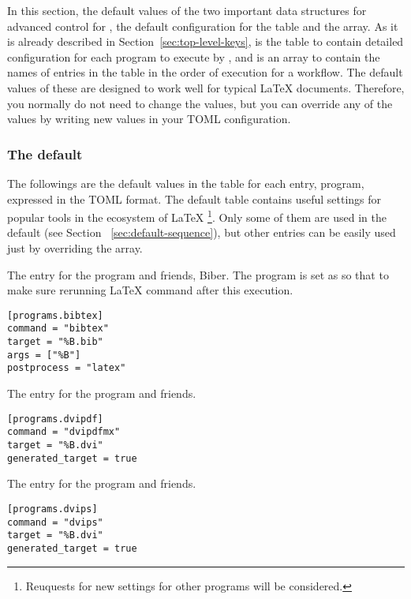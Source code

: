 \documentclass{llmk-doc}
\begin{document}
In this section, the default values of the two important data structures for
advanced control for , \ie the default configuration for the
 table and the  array. As it is already described
in Section~\ref{sec:top-level-keys},  is the table to contain
detailed configuration for each program to execute by , and
 is an array to contain the names of entries in the
 table in the order of execution for a workflow. The default
values of these are designed to work well for typical {\LaTeX} documents.
Therefore, you normally do not need to change the values, but you can override
any of the values by writing new values in your TOML configuration.

\subsubsection{The default }
\label{sec:default-programs}

The followings are the default values in the  table for each
entry, \ie program, expressed in the TOML format. The default 
table contains useful settings for popular tools in the ecosystem of {\LaTeX}%
\footnote{Reuquests for new settings for other programs will be considered.}.
Only some of them are used in the default  (see Section~%
\ref{sec:default-sequence}), but other entries can be easily used just by
overriding the  array.

 The entry for the {\BibTeX} program and friends, \eg Biber.
The  program is set as  so that to make sure
rerunning {\LaTeX} command after this execution.
%
\begin{lstlisting}[style=toml]
[programs.bibtex]
command = "bibtex"
target = "%B.bib"
args = ["%B"]
postprocess = "latex"
\end{lstlisting}

 The entry for the  program and friends.
%
\begin{lstlisting}[style=toml]
[programs.dvipdf]
command = "dvipdfmx"
target = "%B.dvi"
generated_target = true
\end{lstlisting}

 The entry for the  program and friends.
%
\begin{lstlisting}[style=toml]
[programs.dvips]
command = "dvips"
target = "%B.dvi"
generated_target = true
\end{lstlisting}
\end{document}
